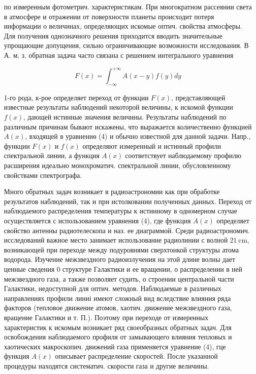 \documentclass[10pt]{article}
\begin{document}
по измеренным фотометрич. характеристикам. При многократном рассеянии света в атмосфере и отражении от поверхности планеты происходит потеря информации о величинах, определяющих искомые оптич. свойства атмосферы. Для получения однозначного решения приходится вводить значительные упрощающие допущения, сильно ограничивающие возможности исследования. В А. м. з. обратная задача часто связана с решением интегрального уравнения



\[

F(x)=\int_{-\infty}^{+\infty} A(x-y) f(y) d y

\]



1-го рода, к-рое определяет переход от функции $F(x)$, представляющей известные результаты наблюдений некоторой величины, к искомой функции $f(x)$, дающей истинные значения величины. Результаты наблюдений по различным причинам бывают искажены, что выражается количественно функцией $A(x)$, входящей в уравнениө (4) и обычно известной для данной задачи. Напр., функции $F(x)$ и $f(x)$ определяют измеренный и истинный профили спектральной линии, а функция $A(x)$ соответствует наблюдаемому профилю расширения идеально монохроматич. спектральной линии, обусловленному свойствами спектрографа.



Много обратных задач возникает в радиоастрономии как при обработке результатов наблюдений, так и при истолковании полученных данных. Переход от наблюдаемого распределения температуры к истинному в одномерном случае осуществляется с использованием уравнения (4), где функция $A(x)$ определяет свойство антенны радиотелескопа и наз. ее диаграммой. Среди радиоастрономич. исследований важное место занимает использование радиолинии с волной $21 \mathrm{~cm}$, возникающей при переходе между подуровнями сверхтонкой структуры атома водорода. Изучение межзвездного радиоизлучения на этой длине волны дает ценные сведения 0 структуре Галактики и ее вращении, о распределении в ней межзвездного газа, а также позволяет судить, о строении центральной части Галактики, недоступной для оптич. методов. Наблюдаемые в различных направлениях профили линиі имеют сложный вид вследствие влияния ряда факторов (тепловое движение атомов, хаотич. движение межзвездного газа, вращение Галактики и т. П.). Поэтому при переходе от измеренных характеристик к искомым возникает ряд своеобразных обратных задач. Для освобождения наблюдаемого профиля от замывающего влияния тепловых и хаотических макроскопич. движений газа применяется уравнение (4), гце функция $A(x)$ описывает распределение скоростей. После указанной процедуры находятся систематич. скорости газа и другие величины.
\end{document}
